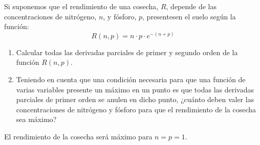 {Si suponemos que el rendimiento de una cosecha, $R$, depende de las concentraciones de nitrógeno, $n$, y fósforo, $p$, presentesen el suelo según la función:
\[
R(n,p) = n \cdot p \cdot e^{ - (n + p)}
\]
\begin{enumerate}
\item Calcular todas las derivadas parciales de primer y segundo orden de la función $R(n,p)$.
\item Teniendo en cuenta que una condición necesaria para que una función de varias variables presente un máximo en un
punto es que todas las derivadas parciales de primer orden se anulen en dicho punto, ¿cuánto deben valer las
concentraciones de nitrógeno y fósforo para que el rendimiento de la cosecha sea máximo?
\end{enumerate}
}
{El rendimiento de la cosecha será máximo para $n=p=1$. 
}
{
}


